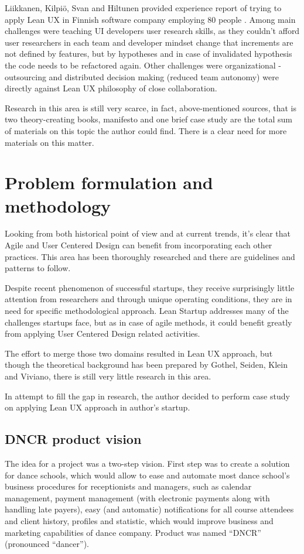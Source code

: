 \documentclass{article}
\begin{document}
Liikkanen, Kilpiö, Svan and Hiltunen provided experience report of trying to apply Lean UX in Finnish software company employing 80 people \cite{liikkanen2014lean}. Among main challenges were teaching UI developers user research skills, as they couldn't afford user researchers in each team and developer mindset change that increments are not defined by features, but by hypotheses and in case of invalidated hypothesis the code needs to be refactored again. Other challenges were organizational - outsourcing and distributed decision making (reduced team autonomy) were directly against Lean UX philosophy of close collaboration.

Research in this area is still very scarce, in fact, above-mentioned sources, that is two theory-creating books, manifesto and one brief case study are the total sum of materials on this topic the author could find. There is a clear need for more materials on this matter.

\section{Problem formulation and methodology}
\label{sec:probl-form-meth}
Looking from both historical point of view and at current trends, it's clear that Agile and User Centered Design can benefit from incorporating each other practices. This area has been thoroughly researched and there are guidelines and patterns to follow.

Despite recent phenomenon of successful startups, they receive surprisingly little attention from researchers and through unique operating conditions, they are in need for specific methodological approach. Lean Startup addresses many of the challenges startups face, but as in case of agile methods, it could benefit greatly from applying User Centered Design related activities.

The effort to merge those two domains resulted in Lean UX approach, but though the theoretical background has been prepared by Gothel, Seiden, Klein and Viviano, there is still very little research in this area.

In attempt to fill the gap in research, the author decided to perform case study on applying Lean UX approach in author's startup.

\subsection{DNCR product vision}
The idea for a project was a two-step vision. First step was to create a solution for dance schools, which would allow to ease and automate most dance school's business procedures for receptionists and managers, such as calendar management, payment management (with electronic payments along with handling late payers), easy (and automatic) notifications for all course attendees and client history, profiles and statistic, which would improve business and marketing capabilities of dance company. Product was named ``DNCR'' (pronounced ``dancer'').
\end{document}
